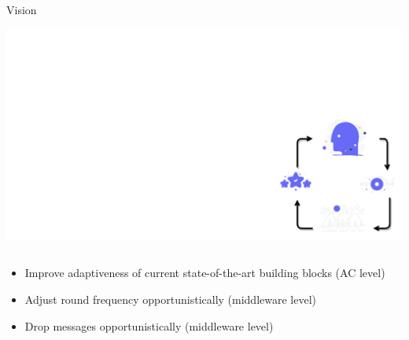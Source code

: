 \begin{frame}{\playfairblack Vision}
  \begin{backgroundblock} 
    \includegraphics[width=\paperwidth]{img/rl-background.pdf} 
  \end{backgroundblock}
  \begin{columns}[onlytextwidth, t]
    \begin{column}{0.7\textwidth}
      \begin{card}
        \begin{itemize}
          \item[\highlightAlt{\faStar}] Improve adaptiveness of current state-of-the-art building blocks (AC level)
          \item[\highlightAlt{\faStar}] Adjust round frequency opportunistically (middleware level)
          \item[\highlightAlt{\faStar}] Drop messages opportunistically (middleware level)
        \end{itemize}
      \end{card}
    \end{column}
  \end{columns}
\end{frame}